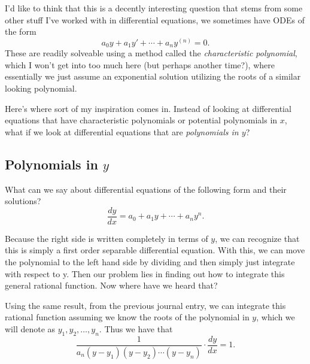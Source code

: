 I'd like to think that this is a decently interesting question that stems from
some other stuff I've worked with in differential equations, we sometimes have
ODEs of the form
\[
    a_0y + a_1y' + \cdots + a_n y^{\left( n \right)} = 0
.\]
These are readily solveable using a method called the \textit{characteristic
polynomial},  which I won't get into too much here
(but perhaps another time?), where essentially we just assume an exponential
solution utilizing the roots of a similar looking polynomial.

Here's where sort of my inspiration comes in. Instead of looking at
differential equations that have characteristic polynomials or potential
polynomials in \( x \), what if we look at differential equations that are
\textit{polynomials in \( y \)}?

\subsection{Polynomials in \( y \)}

\begin{blackbox}
    \begin{problem}
        What can we say about differential equations of the following form and
        their solutions?
        \[
            \frac{dy}{dx} = a_0 + a_1 y + \cdots + a_n y^n
        .\]
    \end{problem}
\end{blackbox}

Because the right side is written completely in terms of \( y \), we can
recognize that this is simply a first order separable differential equation.
With this, we can move the polynomial to the left hand side by dividing and
then simply just integrate with respect to y. Then our problem lies in finding
out how to integrate this general rational function. Now where have we heard
that?

Using the same result,  from
the previous journal entry, we can integrate this rational function assuming we
know the roots of the polynomial in \( y \), which we will denote as \( y_1,
y_2, \ldots, y_n \). Thus we have that
\[
    \frac{1}{a_n \left( y - y_1 \right) \left( y - y_2 \right) \cdots \left( y - y_n \right)} \cdot \frac{dy}{dx} = 1
.\]

